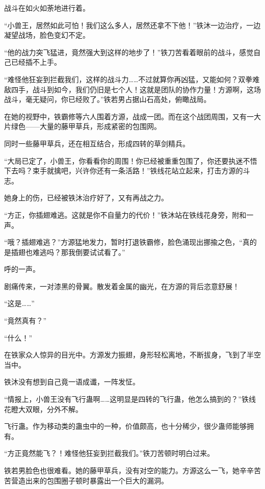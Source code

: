 
\begin{this_body}



战斗在如火如荼地进行着。

“小兽王，居然如此可怕！我们这么多人，居然还拿不下他！”铁沐一边治疗，一边凝望战场，脸色变幻不定。

“他的战力突飞猛进，竟然强大到这样的地步了！”铁刀苦看着眼前的战斗，感觉自己已经插不上手。

“难怪他狂妄到拦截我们，这样的战斗力……不过就算你再凶猛，又能如何？双拳难敌四手，战斗到如今，我们仍旧是七个人！这就是团队的协作力量！方源啊，这场战斗，毫无疑问，你已经败了。”铁若男占据山石高处，俯瞰战局。

在她的视野中，铁霸修等六人围着方源，战成一团。而在这个战团周围，又有一大片绿色——大量的藤甲草兵，形成紧密的包围网。

同时一些藤甲草兵，还在相互结合，形成四转的草剑精兵。

“大局已定了，小兽王，你看看你的周围！你已经被重重包围了，你还要执迷不悟下去吗？束手就擒吧，兴许你还有一条活路！”铁线花站立起来，打击方源的斗志。

她身上的伤，已经被铁沐治疗好了，又有再战之力。

“方正，你插翅难逃。这就是你不自量力的代价！”铁沐站在铁线花身旁，附和一声。

“哦？插翅难逃？”方源猛地发力，暂时打退铁霸修，脸色涌现出挪揄之色，“真的是插翅也难逃吗？那我倒要试试看了。”

呼的一声。

剧痛传来，一对漆黑的骨翼。散发着金属的幽光，在方源的背后恣意舒展！

“这是……”

“竟然真有？”

“什么！”

在铁家众人惊异的目光中。方源发力振翅，身形轻松离地，不断拔身，飞到了半空当中。

铁沐没有想到自己竟一语成谶，一阵发怔。

“情报上，小兽王没有飞行蛊啊……这明显是四转的飞行蛊，他怎么搞到的？”铁线花瞪大双眼，分外不解。

飞行蛊。作为移动类的蛊虫中的一种，价值颇高，也十分稀少，很少蛊师能够拥有。

“方正竟然能飞？！难怪他狂妄到拦截我们。”铁刀苦顿时明白过来。

铁若男脸色也很难看。她的藤甲草兵，没有对空的能力。方源这么一飞，她辛辛苦苦营造出来的包围圈子顿时暴露出一个巨大的漏洞。


\end{this_body}
